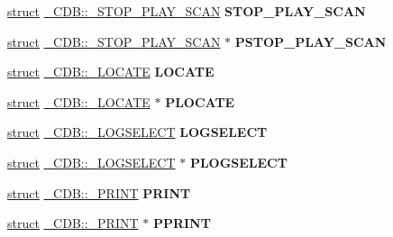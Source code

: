 \begin{DoxyCompactItemize}
\hyperlink{interfacestruct}{struct} \hyperlink{struct___c_d_b_1_1___s_t_o_p___p_l_a_y___s_c_a_n}{\+\_\+\+C\+D\+B\+::\+\_\+\+S\+T\+O\+P\+\_\+\+P\+L\+A\+Y\+\_\+\+S\+C\+AN} {\bfseries S\+T\+O\+P\+\_\+\+P\+L\+A\+Y\+\_\+\+S\+C\+AN}
\item 
\mbox{\label{union___c_d_b_aae1aeb3ec98a32f2a323e5799169c4b7}} 
\hyperlink{interfacestruct}{struct} \hyperlink{struct___c_d_b_1_1___s_t_o_p___p_l_a_y___s_c_a_n}{\+\_\+\+C\+D\+B\+::\+\_\+\+S\+T\+O\+P\+\_\+\+P\+L\+A\+Y\+\_\+\+S\+C\+AN} $\ast$ {\bfseries P\+S\+T\+O\+P\+\_\+\+P\+L\+A\+Y\+\_\+\+S\+C\+AN}
\item 
\mbox{\label{union___c_d_b_a153c07b47ef9504473a6889f700e2674}} 
\hyperlink{interfacestruct}{struct} \hyperlink{struct___c_d_b_1_1___l_o_c_a_t_e}{\+\_\+\+C\+D\+B\+::\+\_\+\+L\+O\+C\+A\+TE} {\bfseries L\+O\+C\+A\+TE}
\item 
\mbox{\label{union___c_d_b_a02ec4d58d685ca89e89fd5eb0b799c44}} 
\hyperlink{interfacestruct}{struct} \hyperlink{struct___c_d_b_1_1___l_o_c_a_t_e}{\+\_\+\+C\+D\+B\+::\+\_\+\+L\+O\+C\+A\+TE} $\ast$ {\bfseries P\+L\+O\+C\+A\+TE}
\item 
\mbox{\label{union___c_d_b_aa7f23b6c06f287411d59fefaebc90ec1}} 
\hyperlink{interfacestruct}{struct} \hyperlink{struct___c_d_b_1_1___l_o_g_s_e_l_e_c_t}{\+\_\+\+C\+D\+B\+::\+\_\+\+L\+O\+G\+S\+E\+L\+E\+CT} {\bfseries L\+O\+G\+S\+E\+L\+E\+CT}
\item 
\mbox{\label{union___c_d_b_a2d37d32f9e50b0dc11dcac2df295903b}} 
\hyperlink{interfacestruct}{struct} \hyperlink{struct___c_d_b_1_1___l_o_g_s_e_l_e_c_t}{\+\_\+\+C\+D\+B\+::\+\_\+\+L\+O\+G\+S\+E\+L\+E\+CT} $\ast$ {\bfseries P\+L\+O\+G\+S\+E\+L\+E\+CT}
\item 
\mbox{\label{union___c_d_b_ab3576bf570a8c364c824698387ad32a1}} 
\hyperlink{interfacestruct}{struct} \hyperlink{struct___c_d_b_1_1___p_r_i_n_t}{\+\_\+\+C\+D\+B\+::\+\_\+\+P\+R\+I\+NT} {\bfseries P\+R\+I\+NT}
\item 
\mbox{\label{union___c_d_b_a0974f9a53e313a387e17c98223ba9a64}} 
\hyperlink{interfacestruct}{struct} \hyperlink{struct___c_d_b_1_1___p_r_i_n_t}{\+\_\+\+C\+D\+B\+::\+\_\+\+P\+R\+I\+NT} $\ast$ {\bfseries P\+P\+R\+I\+NT}

\end{DoxyCompactItemize}
